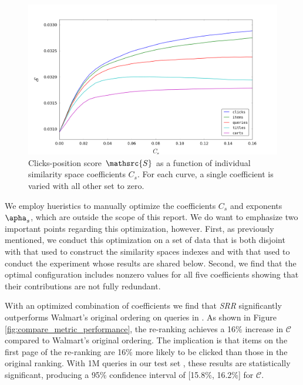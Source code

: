 \documentclass{article}
\begin{document}
\begin{figure}[htbp!]
    \centering
    \includegraphics[width=\textwidth]{000050_0_48chunk_k100_i2_n100_avg_click_position_score_0-0_16.png}
    \caption{Clicks-position score $\mathsrc{S}$ as a function of individual similarity space coefficients $C_s$. For each curve, a single coefficient is varied with all other set to zero.}
    \label{fig:avg_clicks_position_score}
\end{figure}

We employ hueristics to manually optimize the coefficients $C_s$ and exponents
$\apha_s$, which are outside the scope of this report. We do want to emphasize
two important points regarding this optimization, however. First, as previously
mentioned, we conduct this optimization on a set of data that is both disjoint
with that used to construct the similarity spaces indexes and with that used to
conduct the experiment whose results are shared below. Second, we find that the
optimal configuration includes nonzero values for all five coefficients showing
that their contributions are not fully redundant.

With an optimized combination of coefficients we find that {\em SRR} significantly 
outperforms Walmart’s original ordering on queries in {\chi}. As shown in Figure
\ref{fig:compare_metric_performance}, the re-ranking achieves a 16\% increase
in $\mathscr{C}$ compared to Walmart’s original ordering. The implication is
that items on the first page of the re-ranking are 16\% more likely to be clicked than those
in the original ranking. With 1M queries in our test set {\chi}, these results are
statistically significant, producing a 95\% confidence interval of [15.8\%,
16.2\%] for $\mathscr{C}$.
\end{document}
